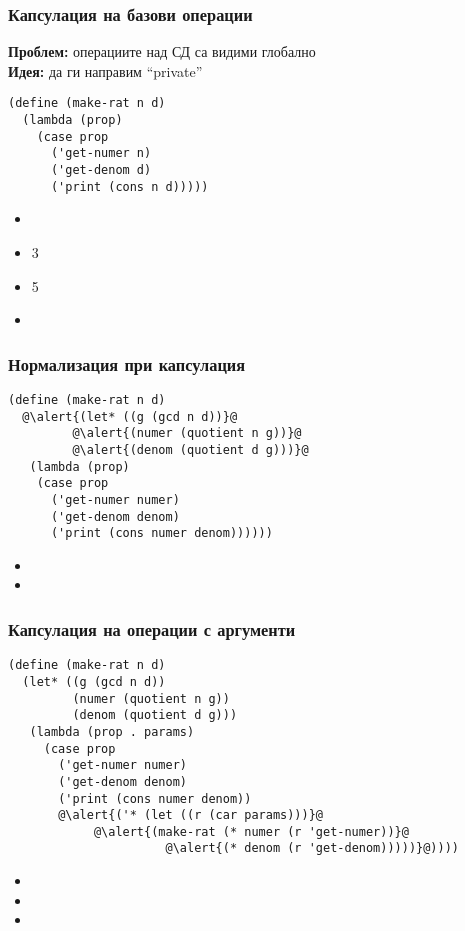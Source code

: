 \documentclass{beamer}
\begin{document}
\begin{frame}[fragile]
  \frametitle{Капсулация на базови операции}

  \textbf{Проблем:} операциите над СД са видими глобално\\[1em]
  \pause
  \textbf{Идея:} да ги направим ``private''
  \pause
\begin{lstlisting}
(define (make-rat n d)
  (lambda (prop)
    (case prop
      ('get-numer n)
      ('get-denom d)
      ('print (cons n d)))))
\end{lstlisting}
  \pause
  \begin{itemize}
  \item {}
  \item {}3
  \item {}5
  \item {}
  \end{itemize}
\end{frame}

\begin{frame}[fragile]
  \frametitle{Нормализация при капсулация}

\begin{lstlisting}
(define (make-rat n d)
  @\alert{(let* ((g (gcd n d))}@
         @\alert{(numer (quotient n g))}@
         @\alert{(denom (quotient d g)))}@
   (lambda (prop)
    (case prop
      ('get-numer numer)
      ('get-denom denom)
      ('print (cons numer denom))))))
\end{lstlisting}
  \pause
  \begin{itemize}
  \item {}
  \item {}
  \end{itemize}
\end{frame}

\begin{frame}[fragile]
  \frametitle{Капсулация на операции с аргументи}

\small
\begin{lstlisting}
(define (make-rat n d)
  (let* ((g (gcd n d))
         (numer (quotient n g))
         (denom (quotient d g)))
   (lambda (prop . params)
     (case prop
       ('get-numer numer)
       ('get-denom denom)
       ('print (cons numer denom))
       @\alert{('* (let ((r (car params)))}@
            @\alert{(make-rat (* numer (r 'get-numer))}@
                      @\alert{(* denom (r 'get-denom)))))}@))))
\end{lstlisting}
  \pause
  \begin{itemize}
  \item {}
  \item {}
  \item {}
  \end{itemize}
\end{frame}
\end{document}

